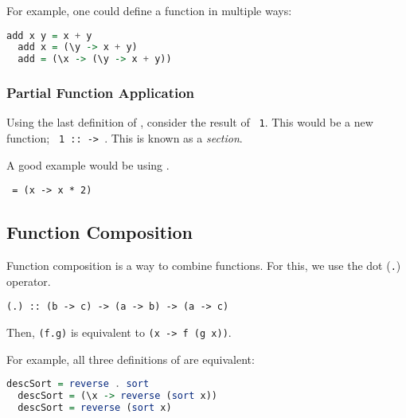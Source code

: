For example, one could define a function \texttt{} in multiple ways:
\begin{lstlisting}[language=haskell]
  add x y = x + y
  add x = (\y -> x + y)
  add = (\x -> (\y -> x + y))
\end{lstlisting}

\subsubsection{Partial Function Application}
Using the last definition of \texttt{}, consider the result of \texttt{ 1}. This would be a new function; \texttt{ 1 ::  -> }. This is known as a \textit{section}.

A good example would be using \texttt{}.
\begin{center}
  \texttt{ =  (x -> x * 2)}
\end{center}

\subsection{Function Composition}
Function composition is a way to combine functions. For this, we use the dot (\texttt{.}) operator.
\begin{center}
  \texttt{(.) :: (b -> c) -> (a -> b) -> (a -> c)}
\end{center}
Then, \texttt{(f.g)} is equivalent to \texttt{(x -> f (g x))}.

For example, all three definitions of \texttt{} are equivalent:
\begin{lstlisting}[language=haskell]
  descSort = reverse . sort
  descSort = (\x -> reverse (sort x))
  descSort = reverse (sort x)
\end{lstlisting}